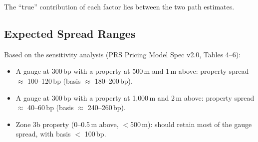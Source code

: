 \documentclass[11pt,a4paper]{article}
\begin{document}
\noindent The ``true'' contribution of each factor lies between the two path estimates.

\subsection{Expected Spread Ranges}

Based on the sensitivity analysis (PRS Pricing Model Spec v2.0, Tables 4--6):

\begin{itemize}[nosep]
    \item A gauge at 300\,bp with a property at 500\,m and 1\,m above: property spread
          $\approx$ 100--120\,bp (basis $\approx$ 180--200\,bp).
    \item A gauge at 300\,bp with a property at 1{,}000\,m and 2\,m above: property
          spread $\approx$ 40--60\,bp (basis $\approx$ 240--260\,bp).
    \item Zone 3b property (0--0.5\,m above, $<$500\,m): should retain most of the gauge
          spread, with basis $<$ 100\,bp.
\end{itemize}
\end{document}
